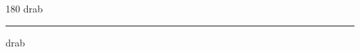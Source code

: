 
\begin{frame}
\begin{center}
\begin{turn}{180}
{\fontsize{2.5cm}{1em}\selectfont drab}
\end{turn}
\vspace{1em}\par  
\hrule
\vspace{1em}\par  
{\fontsize{2.5cm}{1em}\selectfont drab}
\end{center}
\end{frame}

